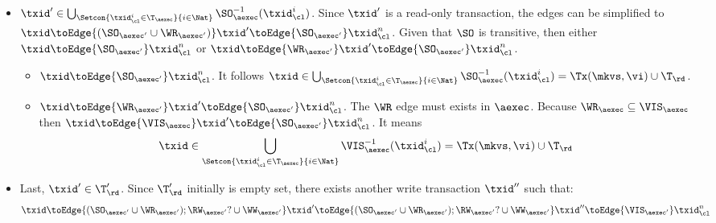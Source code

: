 \begin{itemize}
\begin{itemize}
\begin{itemize}
    \item \( \txid' \in \bigcup_{\Setcon{\txid_{\cl}^{i} \in \T_{\aexec} }{ i \in \Nat }} \SO_{\aexec}^{-1}(\txid^i_\cl) \).
    Since \( \txid' \) is a read-only transaction, 
    the edges can be simplified to \( \txid \toEdge{(\SO_{\aexec'} \cup \WR_{\aexec'} )} \txid' \toEdge{\SO_{\aexec'}}  \txid_\cl^n \).
    Given that \( \SO \) is transitive, then  either \( \txid \toEdge{\SO_{\aexec'}} \txid_\cl^n \) or \( \txid \toEdge{\WR_{\aexec'} } \txid' \toEdge{\SO_{\aexec'}}  \txid_\cl^n \).
    \begin{itemize}
        \item \( \txid \toEdge{\SO_{\aexec'}} \txid_\cl^n \).
            It follows \( \txid \in \bigcup_{\Setcon{\txid_{\cl}^{i} \in \T_{\aexec} }{ i \in \Nat }} \SO_{\aexec}^{-1}(\txid^i_\cl) = \Tx(\mkvs, \vi) \cup \T_\rd \).
        \item \( \txid \toEdge{\WR_{\aexec'} } \txid' \toEdge{\SO_{\aexec'}}  \txid_\cl^n \).
            The \( \WR \) edge must exists in \( \aexec \).
            Because \( \WR_\aexec \subseteq \VIS_\aexec \) then  \( \txid \toEdge{\VIS_{\aexec} } \txid' \toEdge{\SO_{\aexec'}}  \txid_\cl^n  \).
            It means 
            \[ 
                \txid \in \bigcup_{\Setcon{\txid_{\cl}^{i} \in \T_{\aexec} }{ i \in \Nat }} \VIS_{\aexec}^{-1}(\txid^i_\cl) = \Tx(\mkvs, \vi) \cup \T_\rd 
            \]
    \end{itemize}
    \item 
    Last, \( \txid' \in \T'_\rd \).
    Since \( \T'_\rd \) initially is empty set, there exists another write transaction \( \txid'' \) such that:
    \[
        \txid \toEdge{(\SO_{\aexec'} \cup \WR_{\aexec'} ) ; \RW_{\aexec'}? \cup \WW_{\aexec'}} \txid' \toEdge{(\SO_{\aexec'} \cup \WR_{\aexec'} ) ; \RW_{\aexec'}? \cup \WW_{\aexec'}} \txid'' \toEdge{\VIS_{\aexec'}}  \txid_\cl^n
    \]

\end{itemize}
\end{itemize}
\end{itemize}
